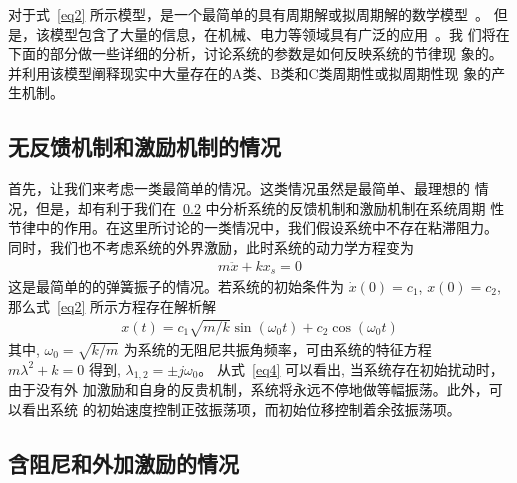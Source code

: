 \documentclass[withoutpreface,bwprint]{cumcmthesis} %
\begin{document}
对于式~\eqref{eq2} 所示模型，是一个最简单的具有周期解或拟周期解的数学模型~。
但是，该模型包含了大量的信息，在机械、电力等领域具有广泛的应用~。我
们将在下面的部分做一些详细的分析，讨论系统的参数是如何反映系统的节律现
象的。并利用该模型阐释现实中大量存在的A类、B类和C类周期性或拟周期性现
象的产生机制。

\subsection{无反馈机制和激励机制的情况}
\label{sec4-1}

首先，让我们来考虑一类最简单的情况。这类情况虽然是最简单、最理想的
情况，但是，却有利于我们在~\ref{sec4-2} 中分析系统的反馈机制和激励机制在系统周期
性节律中的作用。在这里所讨论的一类情况中，我们假设系统中不存在粘滞阻力。
同时，我们也不考虑系统的外界激励，此时系统的动力学方程变为
\begin{align}
    \label{eq3}
    m \ddot{x}+kx_{s}=0
    \end{align}
 这是最简单的的弹簧振子的情况。若系统的初始条件为 $ \dot{x}(0)=c_{1}$, $x(0)=c_{2} $, 那么式~\eqref{eq2} 所示方程存在解析解
\begin{align}
\label{eq4}
x(t)=c_{1} \sqrt{m / k} \sin \left(\omega_{0} t\right)+c_{2} \cos \left(\omega_{0} t\right)
\end{align}
其中, $ \omega_{0}=\sqrt{k / m} $ 为系统的无阻尼共振角频率，可由系统的特征方程 $ m \lambda^{2}+k=0 $ 得到, $ \lambda_{1,2}=\pm j \omega_{0}  $。 从式~\eqref{eq4} 可以看出, 当系统存在初始扰动时，由于没有外 加激励和自身的反贵机制，系统将永远不停地做等幅振荡。此外，可以看出系统 的初始速度控制正弦振荡项，而初始位移控制着余弦振荡项。

\subsection{含阻尼和外加激励的情况}
\label{sec4-2}
\end{document}
